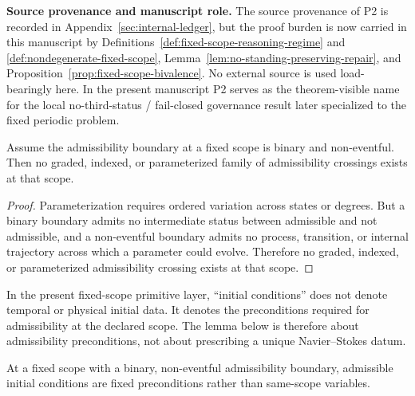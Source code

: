 \noindent\textbf{Source provenance and manuscript role.} The source provenance of P2 is recorded in Appendix~\ref{sec:internal-ledger}, but the proof burden is now carried in this manuscript by Definitions~\ref{def:fixed-scope-reasoning-regime} and \ref{def:nondegenerate-fixed-scope}, Lemma~\ref{lem:no-standing-preserving-repair}, and Proposition~\ref{prop:fixed-scope-bivalence}. No external source is used load-bearingly here. In the present manuscript P2 serves as the theorem-visible name for the local no-third-status / fail-closed governance result later specialized to the fixed periodic problem.

\begin{lemma}\label{lem:no-parameterized-admissibility-crossing}
Assume the admissibility boundary at a fixed scope is binary and non-eventful. Then no graded, indexed, or parameterized family of admissibility crossings exists at that scope.
\end{lemma}

\begin{proof}
Parameterization requires ordered variation across states or degrees. But a binary boundary admits no intermediate status between admissible and not admissible, and a non-eventful boundary admits no process, transition, or internal trajectory across which a parameter could evolve. Therefore no graded, indexed, or parameterized admissibility crossing exists at that scope.
\end{proof}

\begin{remark}\label{rem:primitive-initial-conditions}
In the present fixed-scope primitive layer, ``initial conditions'' does not denote temporal or physical initial data. It denotes the preconditions required for admissibility at the declared scope. The lemma below is therefore about admissibility preconditions, not about prescribing a unique Navier--Stokes datum.
\end{remark}

\begin{lemma}\label{lem:admissible-initial-conditions-not-variables}
At a fixed scope with a binary, non-eventful admissibility boundary, admissible initial conditions are fixed preconditions rather than same-scope variables.
\end{lemma}


